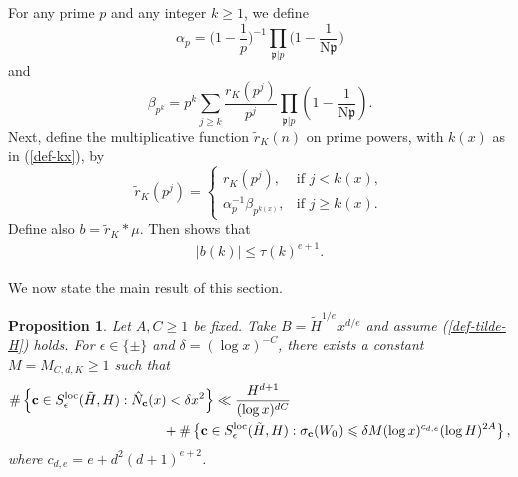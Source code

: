 \documentclass[reqno, 11pt]{amsart}
\renewcommand{\leq}{\leqslant}
\renewcommand{\geq}{\geqslant}
\newtheorem{prop}[theorem]{Proposition}
\theoremstyle{definition}
\theoremstyle{definition}
\renewcommand{\geq}{\geqslant}
\renewcommand{\leq}{\leqslant}
\newcommand{\cc}{\mathbf{c}}
\numberwithin{equation}{section}
\begin{document}
For any prime $p$ and any integer $k \geq 1$, we define
$$
\alpha_p = \Big( 1 - \frac{1}{p} \Big)^{-1} \prod_{\mathfrak{p} | p} \Big( 1 - \frac{1}{\mathrm{N} \mathfrak{p}} \Big)
$$
and 
$$
\beta_{p^k} = p^k \sum_{j \geq k} \frac{r_K(p^j)}{p^j} \prod_{\mathfrak{p} | p} \left( 1 - \frac{1}{\mathrm{N} \mathfrak{p}} \right).
$$
Next, define the multiplicative function $\tilde{r}_K(n)$ on prime powers, with $k(x)$ as in (\ref{def-kx}), by
\[
\tilde{r}_K(p^j) = 
\begin{cases} 
r_K(p^j), & \text{if } j < k(x), \\
\alpha_p^{-1} \beta_{p^{k(x)}}, & \text{if } j \geq k(x).
\end{cases}
\]
Define also $b = \tilde{r}_K * \mu$. Then \cite[Formula (7.27)]{BST} shows that
\begin{align}\label{bound-g}
	|b(k)| \leq \tau(k)^{e+1}.
\end{align}


We now state the main result of this section.
\begin{prop}\label{prop-na}
	Let $A, C \geq 1$ be fixed. Take $B = \tilde{H}^{1/e} x^{d/e}$ and assume (\ref{def-tilde-H}) holds. For $\epsilon \in \{\pm\}$ and $\delta = (\log x)^{-C}$,  there exists a constant $M = M_{C, d, K} \geq 1$ such that
\begin{align*}
& \#\left\{ \cc\in S_\epsilon^{\textnormal{loc}}(\tilde H, H): 
\hat N_\cc(x) <\delta x^2\right\} 
 \ll \frac{H^{d+1}}{(\log x)^{dC}}\\
& \quad \quad \quad \quad \quad \quad \quad \quad \quad \quad \quad \ + \#
\left\{ \cc\in S_\epsilon^{\textnormal{loc}}(\tilde H, H):  \sigma_{\cc}(W_0) \leq \delta M (\log x)^{c_{d,e}} (\log H)^{2A}\right\},
\end{align*}
where $c_{d,e} = e + d^2(d+1)^{e+2}$.
\end{prop}
\end{document}
